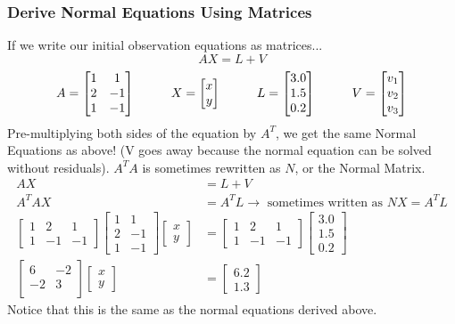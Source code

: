 \subsubsection*{Derive Normal Equations Using Matrices}
If we write our initial observation equations as matrices...
\[AX = L + V
\]
\[
A = 
\begin{bmatrix}
1 & 1 \\ 2 & -1 \\ 1 & -1 
\end{bmatrix}
\hspace{1cm}
X = 
\begin{bmatrix}
x \\ y
\end{bmatrix}\\
\hspace{1cm}
L = 
\begin{bmatrix}
3.0 \\ 1.5 \\ 0.2
\end{bmatrix}
\hspace{1cm}
V = 
\begin{bmatrix}
v_1 \\ v_2 \\ v_3
\end{bmatrix}
\]
Pre-multiplying both sides of the equation by $A^T$, we get the same Normal Equations as above! (V goes away because the normal equation can be solved without residuals).  $A^TA$ is sometimes rewritten as $N$, or the Normal Matrix.
\begin{align*}
AX &= L + V \\
A^TAX &= A^TL \rightarrow \text{ sometimes written as } NX = A^TL\\
\begin{bmatrix}
1 & 2 & 1 \\ 1 & -1 & -1
\end{bmatrix}
\begin{bmatrix}
1 & 1 \\ 2 & -1 \\ 1 & -1 
\end{bmatrix}
\begin{bmatrix}
x \\ y
\end{bmatrix}
&=
\begin{bmatrix}
1 & 2 & 1 \\ 1 & -1 & -1
\end{bmatrix}
\begin{bmatrix}
3.0 \\ 1.5 \\ 0.2
\end{bmatrix} \\
\begin{bmatrix}
6 & -2 \\ 
-2 & 3 \\
\end{bmatrix}
\begin{bmatrix}
x \\ y
\end{bmatrix}
&= 
\begin{bmatrix}
6.2 \\ 1.3
\end{bmatrix}
\end{align*}
Notice that this is the same as the normal equations derived above.
